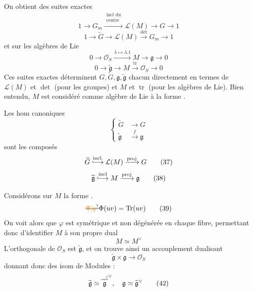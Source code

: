 On obtient des suites exactes
\[
1\longrightarrow G_m\xrightarrow{\substack{\text{incl du}\\\text{centre}}}\mathcal L(M)\longrightarrow G\longrightarrow 1\tag*{(34)}
\]
\[
1\longrightarrow\widetilde G\longrightarrow\mathcal L(M)\xrightarrow{\det}G_m\longrightarrow1\tag*{(35)}
\]
et sur les algèbres de Lie
\[
0\longrightarrow\mathcal O_S\xrightarrow{\lambda\mapsto\lambda.1}M\longrightarrow\mathfrak g\longrightarrow0\tag*{(34$'$)}
\]
\[
0\longrightarrow\widetilde{\mathfrak g}\longrightarrow M\xrightarrow{\operatorname{tr}}\mathcal O_S\longrightarrow0\tag*{(35$'$)}
\]
Ces suites exactes déterminent $G,\widetilde G,\mathfrak g,\widetilde{\mathfrak g}$ chacun directement en termes de $\mathcal L(M)$ et $\det$ (pour les groupes) et $M$ et $\operatorname{tr}$ (pour les algèbres de Lie). Bien entendu, $M$ est considéré comme algèbre de Lie  à la forme .

Les hom canoniques
\[
\left\{\begin{aligned}
\widetilde G&\longrightarrow G\\
\widetilde{\mathfrak g}&\xrightarrow{f}\mathfrak g
\end{aligned}\right.\tag*{(36}
\]
sont les composés
\[
\widetilde G\overset{\mathrm{incl.}}{\lhook\joinrel\longrightarrow}\mathcal L(M)\xrightarrow{\mathrm{proj}}G\tag*{(37)}
\]
\[
\widetilde{\mathfrak g}\overset{\mathrm{incl}}{\lhook\joinrel\longrightarrow}M\xrightarrow{\mathrm{proj}}\mathfrak g\tag*{(38)}
\]

Considérons sur $M$ la forme   .
\[
\deleted{\unsure{\Phi|q}}\Phi(uv)=\operatorname{Tr}(uv)\tag*{(39)}
\]
On voit alors que $\varphi$ est symétrique et  non dégénérée en chaque fibre, permettant donc d'identifier $M$ à son propre dual
\[
M\simeq M^\vee\tag*{(40)}
\]
L'orthogonale de $\mathcal O_S$ est $\widetilde{\mathfrak g}$, et on trouve ainsi un accouplement dualisant
\[
\widetilde{\mathfrak g}\times\mathfrak g\longrightarrow\mathcal O_S\tag*{(41)}
\]
donnant donc des isom de Modules :
\[
\widetilde{\mathfrak g}\simeq\overset{\deleted{\unsure{\sim}}}{\mathfrak g}^\vee,\quad\mathfrak g\simeq\widetilde{\mathfrak g}^{\vee}\tag*{(42)}
\]

